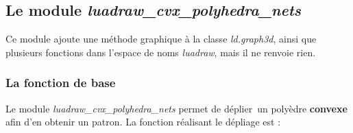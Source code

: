 \subsection{Le module \emph{luadraw\_cvx\_polyhedra\_nets}}

Ce module ajoute une méthode graphique à la classe \emph{ld.graph3d}, ainsi que plusieurs fonctions dans l'espace de noms \emph{luadraw}, mais il ne renvoie rien.

\subsubsection{La fonction de base}

Le module \emph{luadraw\_cvx\_polyhedra\_nets} permet de \og déplier\fg\ un polyèdre \textbf{convexe} afin d'en obtenir un patron. La fonction réalisant le dépliage est :


